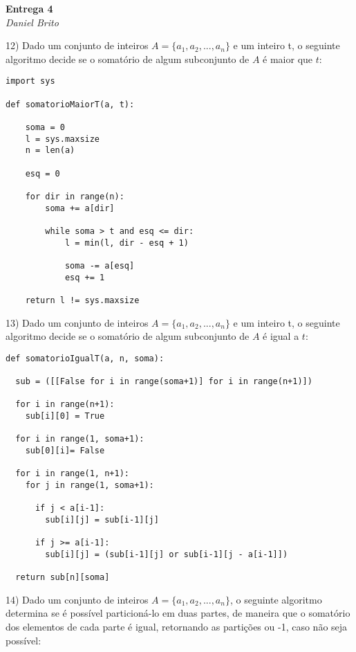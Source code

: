 \documentclass[]{article}
\begin{document}
\begin{center}
  \Large\textbf{Entrega 4}\\
  \large\textit{Daniel Brito}
\end{center}

12) Dado um conjunto de inteiros $A = \{a_1, a_2, ..., a_n\}$ e um inteiro t, o seguinte algoritmo decide se o somatório de algum subconjunto de $A$ é maior que $t$:

\begin{lstlisting}
import sys

def somatorioMaiorT(a, t):
    
    soma = 0
    l = sys.maxsize
    n = len(a)
 
    esq = 0
 
    for dir in range(n):
        soma += a[dir]
 
        while soma > t and esq <= dir:
            l = min(l, dir - esq + 1)

            soma -= a[esq]
            esq += 1
 
    return l != sys.maxsize
\end{lstlisting}

\newpage

13) Dado um conjunto de inteiros $A = \{a_1, a_2, ..., a_n\}$ e um inteiro t, o seguinte algoritmo decide se o somatório de algum subconjunto de $A$ é igual a $t$:

\begin{lstlisting}
def somatorioIgualT(a, n, soma):
    
  sub = ([[False for i in range(soma+1)] for i in range(n+1)])
  
  for i in range(n+1):
    sub[i][0] = True
    
  for i in range(1, soma+1):
    sub[0][i]= False
      
  for i in range(1, n+1):
    for j in range(1, soma+1):
        
      if j < a[i-1]:
        sub[i][j] = sub[i-1][j]
        
      if j >= a[i-1]:
        sub[i][j] = (sub[i-1][j] or sub[i-1][j - a[i-1]])
  
  return sub[n][soma]
\end{lstlisting}

\newpage

14) Dado um conjunto de inteiros $A = \{a_1, a_2, ..., a_n\}$, o seguinte algoritmo determina se é possível particioná-lo em duas partes, de maneira que o somatório dos elementos de cada parte é igual, retornando as partições ou -1, caso não seja possível:
\end{document}
